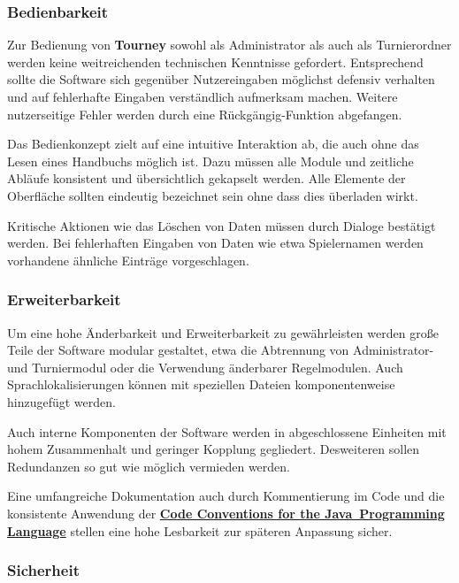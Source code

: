 \documentclass[11pt]{article}
\begin{document}
\subsubsection{Bedienbarkeit}

Zur Bedienung von \textbf{Tourney} sowohl als Administrator als auch als Turnierordner werden keine weitreichenden technischen Kenntnisse gefordert. Entsprechend sollte die Software sich gegenüber Nutzereingaben möglichst defensiv verhalten und auf fehlerhafte Eingaben verständlich aufmerksam machen. Weitere nutzerseitige Fehler werden durch eine Rückgängig-Funktion abgefangen.

Das Bedienkonzept zielt auf eine intuitive Interaktion ab, die auch ohne das Lesen eines Handbuchs möglich ist. Dazu müssen alle Module und zeitliche Abläufe konsistent und übersichtlich gekapselt werden. Alle Elemente der Oberfläche sollten eindeutig bezeichnet sein ohne dass dies überladen wirkt.

Kritische Aktionen wie das Löschen von Daten müssen durch Dialoge bestätigt werden. Bei fehlerhaften Eingaben von Daten wie etwa Spielernamen werden vorhandene ähnliche Einträge vorgeschlagen.

\subsubsection{Erweiterbarkeit}

Um eine hohe Änderbarkeit und Erweiterbarkeit zu gewährleisten werden große Teile der Software modular gestaltet, etwa die Abtrennung von Administrator- und Turniermodul oder die Verwendung änderbarer Regelmodulen. Auch Sprachlokalisierungen können mit speziellen Dateien komponentenweise hinzugefügt werden.

Auch interne Komponenten der Software werden in abgeschlossene Einheiten mit hohem Zusammenhalt und geringer Kopplung gegliedert. Desweiteren sollen Redundanzen so gut wie möglich vermieden werden.

Eine umfangreiche Dokumentation auch durch Kommentierung im Code und die konsistente Anwendung der \href{http://www.oracle.com/technetwork/java/codeconvtoc-136057.html}{\textbf{Code Conventions for the Java\texttrademark\ Programming Language}} stellen eine hohe Lesbarkeit zur späteren Anpassung sicher.

\subsubsection{Sicherheit}
\end{document}
